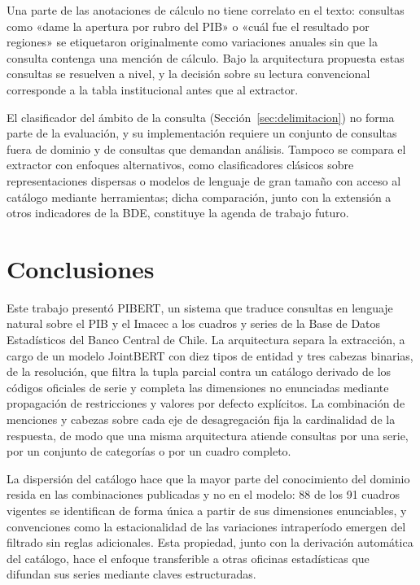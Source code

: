 \documentclass[11pt]{article}
\begin{document}
Una parte de las anotaciones de cálculo no tiene correlato en el texto: consultas
como «dame la apertura por rubro del PIB» o «cuál fue el resultado por regiones»
se etiquetaron originalmente como variaciones anuales sin que la consulta
contenga una mención de cálculo. Bajo la arquitectura propuesta estas consultas
se resuelven a nivel, y la decisión sobre su lectura convencional corresponde a
la tabla institucional antes que al extractor.

El clasificador del ámbito de la consulta (Sección~\ref{sec:delimitacion}) no
forma parte de la evaluación, y su implementación requiere un conjunto de
consultas fuera de dominio y de consultas que demandan análisis. Tampoco se
compara el extractor con enfoques alternativos, como clasificadores clásicos
sobre representaciones dispersas o modelos de lenguaje de gran tamaño con acceso
al catálogo mediante herramientas; dicha comparación, junto con la extensión a
otros indicadores de la BDE, constituye la agenda de trabajo futuro.

\section{Conclusiones}
\label{sec:conclusiones}

Este trabajo presentó PIBERT, un sistema que traduce consultas en lenguaje
natural sobre el PIB y el Imacec a los cuadros y series de la Base de Datos
Estadísticos del Banco Central de Chile. La arquitectura separa la extracción,
a cargo de un modelo JointBERT con diez tipos de entidad y tres cabezas binarias,
de la resolución, que filtra la tupla parcial contra un catálogo derivado de los
códigos oficiales de serie y completa las dimensiones no enunciadas mediante
propagación de restricciones y valores por defecto explícitos. La combinación de
menciones y cabezas sobre cada eje de desagregación fija la cardinalidad de la
respuesta, de modo que una misma arquitectura atiende consultas por una serie,
por un conjunto de categorías o por un cuadro completo.

La dispersión del catálogo hace que la mayor parte del conocimiento del dominio
resida en las combinaciones publicadas y no en el modelo: 88 de los 91 cuadros
vigentes se identifican de forma única a partir de sus dimensiones enunciables,
y convenciones como la estacionalidad de las variaciones intraperíodo emergen del
filtrado sin reglas adicionales. Esta propiedad, junto con la derivación
automática del catálogo, hace el enfoque transferible a otras oficinas
estadísticas que difundan sus series mediante claves estructuradas.
\end{document}
